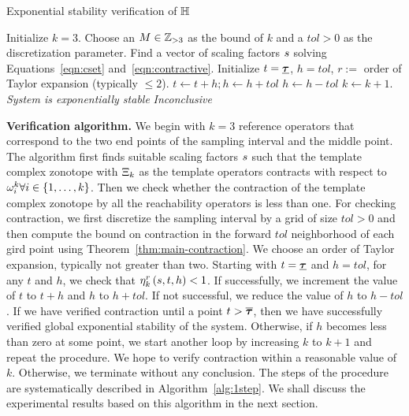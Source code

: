 %
 \begin{algorithm}
\caption{Exponential stability verification of $\mathbb{H}$}
\label{alg:1step}
\begin{algorithmic}[1]
\State Initialize $k=3$.
\State Choose an $M\in\mathbb{Z}_{>3}$ as the bound of $k$ and a $tol>0$ as
the discretization parameter.
\State Find a vector of scaling factors $s$ solving Equations~\ref{eqn:cset} and~\ref{eqn:contractive}.
\State Initialize $t=\bm{\underline{\tau}}$, $h=tol$, $r:=$ order of Taylor
expansion (typically $\leq 2$).
\State $t\gets t+h; h\gets h+tol$
\Else
\State $h\gets h-tol$
\EndIf
{}
\State $k\gets k+1$.  
\EndIf
\EndWhile
{}
\State \emph{System is exponentially stable}
\Else
\State \emph{Inconclusive}
\EndIf
\end{algorithmic}
 \end{algorithm}
%
{\bf Verification algorithm.} We begin with $k=3$ reference
 operators that correspond to the two end points of the sampling
 interval and the middle point.  The algorithm first finds suitable
 scaling factors $s$ such that the template complex zonotope with
 $\Xi_k$ as the template operators contracts with respect to
 $\omega_i^k\forall i\in\left\{1,\ldots,k\right\}$.  Then we check whether the
 contraction of the template complex zonotope by all the reachability
 operators is less than one. For checking contraction, we first
 discretize the sampling interval by a grid of size $tol>0$ and then
 compute the bound on contraction in the forward $tol$ neighborhood of
 each gird point using Theorem~\ref{thm:main-contraction}.  We choose
 an order of Taylor expansion, typically not greater than two.
 Starting with $t=\bm{\underline{\tau}}$ and $h=tol$, for any $t$ and $h$, we check
 that $\eta_{k}^{r}\left(s,t,h\right)<1$.  If successfully, we increment the
 value of $t$ to $t+h$ and $h$ to $h+tol$.  If not successful, we
 reduce the value of $h$ to $h-tol$.  If we have verified contraction
 until a point $t>\bm{\overline{\tau}}$, then we have successfully verified global
 exponential stability of the system.  Otherwise, if $h$ becomes less
 than zero at some point, we start another loop by increasing $k$ to
 $k+1$ and repeat the procedure.  We hope to verify contraction within
 a reasonable value of $k$.  Otherwise, we terminate without any
 conclusion.  The steps of the procedure are systematically described
 in Algorithm~\ref{alg:1step}.  We shall discuss the experimental results
 based on this algorithm in the next section.
%

